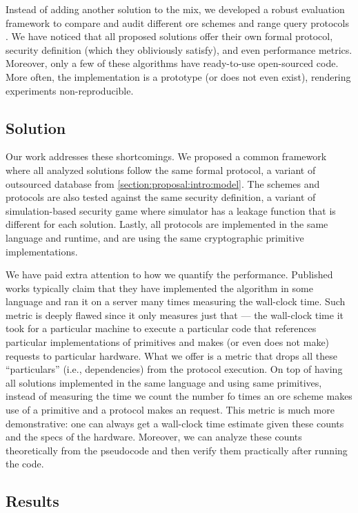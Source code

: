 			Instead of adding another solution to the mix, we developed a robust evaluation framework to compare and audit different \acrshort{ore} schemes and range query protocols \cite{ore-benchmark-17}.
			We have noticed that all proposed solutions offer their own formal protocol, security definition (which they obliviously satisfy), and even performance metrics.
			Moreover, only a few of these algorithms have ready-to-use open-sourced code.
			More often, the implementation is a prototype (or does not even exist), rendering experiments non-reproducible.

		\subsection{Solution}

			Our work addresses these shortcomings.
			We proposed a common framework where all analyzed solutions follow the same formal protocol, a variant of outsourced database from \cref{section:proposal:intro:model}.
			The schemes and protocols are also tested against the same security definition, a variant of simulation-based security game where simulator has a leakage function that is different for each solution.
			Lastly, all protocols are implemented in the same language and runtime, and are using the same cryptographic primitive implementations.

			We have paid extra attention to how we quantify the performance.
			Published works typically claim that they have implemented the algorithm in some language and ran it on a server many times measuring the wall-clock time.
			Such metric is deeply flawed since it only measures just that --- the wall-clock time it took for a particular machine to execute a particular code that references particular implementations of primitives and makes (or even does not make) \IO{} requests to particular hardware.
			What we offer is a metric that drops all these ``particulars'' (i.e., dependencies) from the protocol execution.
			On top of having all solutions implemented in the same language and using same primitives, instead of measuring the time we count the number fo times an \acrshort{ore} scheme makes use of a primitive and a protocol makes an \IO{} request.
			This metric is much more demonstrative: one can always get a wall-clock time estimate given these counts and the specs of the hardware.
			Moreover, we can analyze these counts theoretically from the pseudocode and then verify them practically after running the code.

		\subsection{Results}

